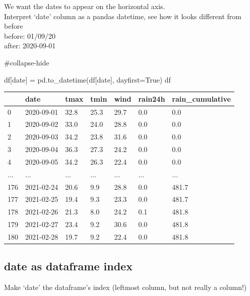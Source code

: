 \documentclass[
  letterpaper,
  DIV=11,
  numbers=noendperiod]{scrreprt}
\newenvironment{Shaded}{\begin{snugshade}}{\end{snugshade}}
\newcommand{\CommentTok}[1]{\textcolor[rgb]{0.37,0.37,0.37}{#1}}
\newcommand{\NormalTok}[1]{\textcolor[rgb]{0.00,0.23,0.31}{#1}}
\newcommand{\OperatorTok}[1]{\textcolor[rgb]{0.37,0.37,0.37}{#1}}
\newcommand{\StringTok}[1]{\textcolor[rgb]{0.13,0.47,0.30}{#1}}
\newcommand{\VariableTok}[1]{\textcolor[rgb]{0.07,0.07,0.07}{#1}}
\begin{document}
We want the dates to appear on the horizontal axis.\\
Interpret `date' column as a pandas datetime, see how it looks different
from before\\
before: 01/09/20\\
after: 2020-09-01

\begin{Shaded}
\begin{Highlighting}[]
\CommentTok{\#collapse{-}hide}

\NormalTok{df[}\StringTok{\textquotesingle{}date\textquotesingle{}}\NormalTok{] }\OperatorTok{=}\NormalTok{ pd.to\_datetime(df[}\StringTok{\textquotesingle{}date\textquotesingle{}}\NormalTok{], dayfirst}\OperatorTok{=}\VariableTok{True}\NormalTok{)}
\NormalTok{df}
\end{Highlighting}
\end{Shaded}

\begin{longtable}[]{@{}lllllll@{}}
\toprule()
& date & tmax & tmin & wind & rain24h & rain\_cumulative \\
\midrule()
\endhead
0 & 2020-09-01 & 32.8 & 25.3 & 29.7 & 0.0 & 0.0 \\
1 & 2020-09-02 & 33.0 & 24.0 & 28.8 & 0.0 & 0.0 \\
2 & 2020-09-03 & 34.2 & 23.8 & 31.6 & 0.0 & 0.0 \\
3 & 2020-09-04 & 36.3 & 27.3 & 24.2 & 0.0 & 0.0 \\
4 & 2020-09-05 & 34.2 & 26.3 & 22.4 & 0.0 & 0.0 \\
... & ... & ... & ... & ... & ... & ... \\
176 & 2021-02-24 & 20.6 & 9.9 & 28.8 & 0.0 & 481.7 \\
177 & 2021-02-25 & 19.4 & 9.3 & 23.3 & 0.0 & 481.7 \\
178 & 2021-02-26 & 21.3 & 8.0 & 24.2 & 0.1 & 481.8 \\
179 & 2021-02-27 & 23.4 & 9.2 & 30.6 & 0.0 & 481.8 \\
180 & 2021-02-28 & 19.7 & 9.2 & 22.4 & 0.0 & 481.8 \\
\bottomrule()
\end{longtable}

\hypertarget{date-as-dataframe-index}{%
\subsection{date as dataframe index}\label{date-as-dataframe-index}}

Make `date' the dataframe's index (leftmost column, but not really a
column!)
\end{document}
